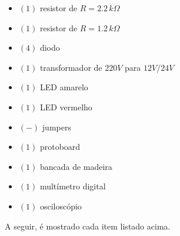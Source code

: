 \documentclass[
	12pt,				%
	openright,			%
	twoside,			%
	a4paper,			%
	article,	
	english,			%
	french,				%
	spanish,			%
	brazil				%
	]{abntex2}
\begin{document}
\begin{itemize}
\item $(1)$ resistor de $R = 2.2\,k\Omega$
\item $(1)$ resistor de $R = 1.2\,k\Omega$
\item $(4)$ diodo
\item $(1)$ transformador de $220V$ para $12V / 24V$
\item $(1)$ LED amarelo
\item $(1)$ LED vermelho
\item $(-)$ jumpers
\item $(1)$ protoboard
\item $(1)$ bancada de madeira
\item $(1)$ multímetro digital
\item $(1)$ osciloscópio
\end{itemize}

\par A seguir, é mostrado cada item listado acima.
\end{document}

